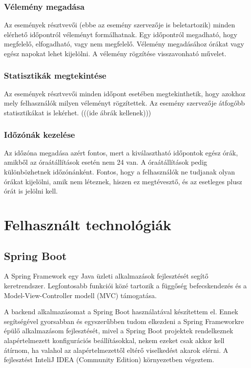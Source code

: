 \documentclass[a4paper,12pt]{report}
\theoremstyle{definition}
\theoremstyle{remark}
\begin{document}
	\subsection{Vélemény megadása}

Az események résztvevői (ebbe az esemény szervezője is beletartozik) minden elérhető időpontról véleményt formálhatnak. Egy időpontról megadható, hogy megfelelő, elfogadható, vagy nem megfelelő. Vélemény megadásához órákat vagy egész napokat lehet kijelölni. A vélemény rögzítése visszavonható művelet.

	\subsection{Statisztikák megtekintése}

Az események résztvevői minden időpont esetében megtekinthetik, hogy azokhoz mely felhasználók milyen véleményt rögzítettek. Az esemény szervezője átfogóbb statisztikákat is lekérhet. (((ide ábrák kellenek)))

	\subsection{Időzónák kezelése}

Az időzóna megadása azért fontos, mert a  kiválasztható időpontok egész órák, amikből az óraátállítások esetén nem 24 van. A óraátállítások pedig különbözhetnek időzónánként. Fontos, hogy a felhasználók ne tudjanak olyan órákat kijelölni, amik nem léteznek, hiszen ez megtévesztő, és az esetleges plusz órát is jelölni kell.

\chapter{Felhasznált technológiák}

\section{Spring Boot}

A Spring Framework egy Java üzleti alkalmazások fejlesztését segítő keretrendszer. Legfontosabb funkciói közé tartozik a függőség befecskendezés és a Model-View-Controller modell (MVC) támogatása.

A backend alkalmazásomat a Spring Boot\cite{Springwebsite} használatával készítettem el. Ennek segítségével gyorsabban és egyszerűbben tudom elkezdeni a Spring Frameworkre épülő alkalmazásom fejlesztését, mivel a Spring Boot projektek rendelkeznek alapértelmezett konfigurációs beállításokkal, nekem ezeket csak akkor kell átírnom, ha valahol az alapértelmezettől eltérő viselkedést akarok elérni. A fejlesztést InteliJ IDEA (Community Edition)\cite{IDEAwebsite} környezetben végeztem.
\end{document}
